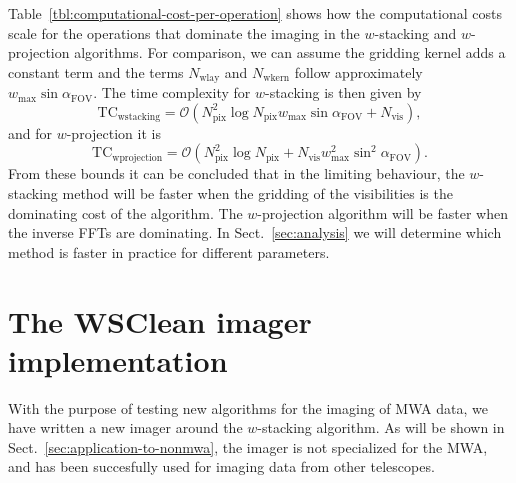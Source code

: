 \documentclass[useAMS,usenatbib]{mn2e}
\begin{document}
Table~\ref{tbl:computational-cost-per-operation} shows how the computational costs scale for the operations that dominate the imaging in the $w$-stacking and $w$-projection algorithms. For comparison, we can assume the gridding kernel adds a constant term and the terms $N_\textrm{wlay}$ and $N_\textrm{wkern}$ follow approximately $w_{\max} \sin \alpha_\textrm{FOV}$. The time complexity for $w$-stacking is then given by
\begin{equation}
\textrm{TC}_\textrm{wstacking}=\mathcal{O}\left(N^2_\textrm{pix} \log N_\textrm{pix} w_{\max} \sin \alpha_\textrm{FOV}+ N_\textrm{vis} \right),
\end{equation}
and for $w$-projection it is
\begin{equation}
\textrm{TC}_\textrm{wprojection}=\mathcal{O}\left(N^2_\textrm{pix} \log N_\textrm{pix} + N_\textrm{vis} w_{\max}^2 \sin^2 \alpha_\textrm{FOV}\right).
\end{equation}
From these bounds it can be concluded that in the limiting behaviour, the $w$-stacking method will be faster when the gridding of the visibilities is the dominating cost of the algorithm. The $w$-projection algorithm will be faster when the inverse FFTs are dominating. In Sect.~\ref{sec:analysis} we will determine which method is faster in practice for different parameters.

\section{The WSClean imager implementation} \label{sec:implementation}
With the purpose of testing new algorithms for the imaging of MWA data, we have written a new imager around the $w$-stacking algorithm. As will be shown in Sect.~\ref{sec:application-to-nonmwa}, the imager is not specialized for the MWA, and has been succesfully used for imaging data from other telescopes.
\end{document}
